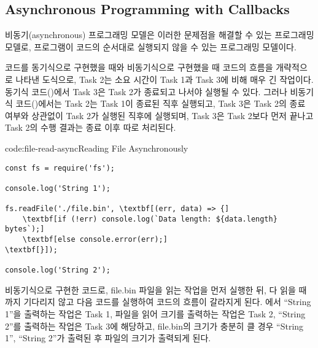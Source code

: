 \subsection*{Asynchronous Programming with Callbacks}

비동기(asynchronous) 프로그래밍 모델은 이러한 문제점을 해결할 수 있는 프로그래밍 모델로, 프로그램이 코드의 순서대로 실행되지 않을 수 있는 프로그래밍 모델이다.


\는 코드를 동기식으로 구현했을 때와 비동기식으로 구현했을 때 코드의 흐름을 개략적으로 나타낸 도식으로, Task 2는 소요 시간이 Task 1과 Task 3에 비해 매우 긴 작업이다. 동기식 코드()에서 Task 3은 Task 2가 종료되고 나서야 실행될 수 있다. 그러나 비동기식 코드()에서는 Task 2는 Task 1이 종료된 직후 실행되고, Task 3은 Task 2의 종료 여부와 상관없이 Task 2가 실행된 직후에 실행되며, Task 3은 Task 2보다 먼저 끝나고 Task 2의 수행 결과는 종료 이후 따로 처리된다.

\begin{codeenv}{code:file-read-async}{Reading File Asynchronously}
\begin{Verbatim}[commandchars=\\\[\]]
const fs = require('fs');

console.log('String 1');

fs.readFile('./file.bin', \textbf[(err, data) => {]
    \textbf[if (!err) console.log(`Data length: ${data.length} bytes`);]
    \textbf[else console.error(err);]
\textbf[}]);

console.log('String 2');
\end{Verbatim}
\end{codeenv}

\는 \를 비동기식으로 구현한 코드로, file.bin 파일을 읽는 작업을 먼저 실행한 뒤, 다 읽을 때까지 기다리지 않고 다음 코드를 실행하여 코드의 흐름이 갈라지게 된다. 에서 ``String 1''을 출력하는 작업은 Task 1, 파일을 읽어 크기를 출력하는 작업은 Task 2, ``String 2''를 출력하는 작업은 Task 3에 해당하고, file.bin의 크기가 충분히 클 경우 ``String 1'', ``String 2''가 출력된 후 파일의 크기가 출력되게 된다.


